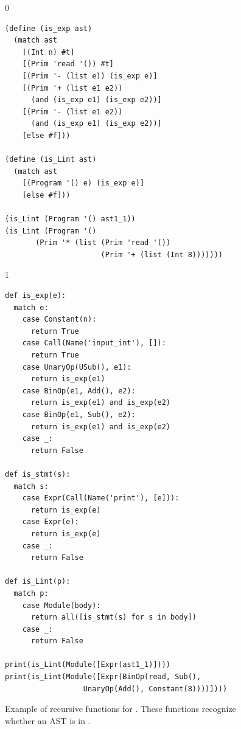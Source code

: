 \documentclass[7x10]{TimesAPriori_MIT}%
\def\racketEd{0}
\def\pythonEd{1}
\providecommand{\BookEdition}{1}
\let\edition\BookEdition
\newcommand{\pythonColor}[0]{}
\numberwithin{theorem}{chapter}
\numberwithin{definition}{chapter}
\numberwithin{equation}{chapter}
\begin{document}
\begin{figure}[tp]
\begin{tcolorbox}[colback=white]
{\if\edition\racketEd
\begin{lstlisting}
(define (is_exp ast)
  (match ast
    [(Int n) #t]
    [(Prim 'read '()) #t]
    [(Prim '- (list e)) (is_exp e)]
    [(Prim '+ (list e1 e2))
      (and (is_exp e1) (is_exp e2))]
    [(Prim '- (list e1 e2))
      (and (is_exp e1) (is_exp e2))]
    [else #f]))

(define (is_Lint ast)
  (match ast
    [(Program '() e) (is_exp e)]
    [else #f]))

(is_Lint (Program '() ast1_1))
(is_Lint (Program '()
       (Prim '* (list (Prim 'read '())
                      (Prim '+ (list (Int 8)))))))
\end{lstlisting}
\fi}
{\if\edition\pythonEd\pythonColor
\begin{lstlisting}
def is_exp(e):
  match e:
    case Constant(n):
      return True
    case Call(Name('input_int'), []):
      return True
    case UnaryOp(USub(), e1):
      return is_exp(e1)
    case BinOp(e1, Add(), e2):
      return is_exp(e1) and is_exp(e2)
    case BinOp(e1, Sub(), e2):
      return is_exp(e1) and is_exp(e2)
    case _:
      return False

def is_stmt(s):
  match s:
    case Expr(Call(Name('print'), [e])):
      return is_exp(e)
    case Expr(e):
      return is_exp(e)
    case _:
      return False
  
def is_Lint(p):
  match p:
    case Module(body):
      return all([is_stmt(s) for s in body])
    case _:
      return False

print(is_Lint(Module([Expr(ast1_1)])))
print(is_Lint(Module([Expr(BinOp(read, Sub(),
                  UnaryOp(Add(), Constant(8))))])))
\end{lstlisting}
\fi}
\end{tcolorbox}
\caption{Example of recursive functions for \LangInt{}. These functions
  recognize whether an AST is in \LangInt{}.}
\label{fig:exp-predicate}
\end{figure}


\end{document}
